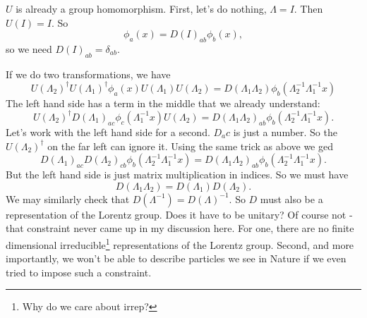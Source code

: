 \documentclass{book}
\begin{document}
$U$ is already a group homomorphism. First, let's do nothing, $\Lambda = I$. Then $U(I) = I$. So
\[
\phi_a (x) = D(I)_{ab} \phi_b (x),
\]
so we need $D(I)_{ab} = \delta_{ab}$.

If we do two transformations, we have
\[
U(\Lambda_2)^\dagger U(\Lambda_1)^\dagger \phi_a (x) U(\Lambda_1) U(\Lambda_2) = D(\Lambda_1 \Lambda_2) \phi_b (\Lambda_2^{-1} \Lambda_1^{-1}x)
\]
The left hand side has a term in the middle that we already understand:
\[
U(\Lambda_2)^\dagger D(\Lambda_1)_{ac} \phi_c(\Lambda_1^{-1} x) U(\Lambda_2) = D(\Lambda_1 \Lambda_2)_{ab} \phi_b (\Lambda_2^{-1} \Lambda_1^{-1} x).
\]
Let's work with the left hand side for a second. $D_ac$ is just a number. So the $U(\Lambda_2)^\dagger$ on the far left can ignore it. Using the same trick as above we ged
\[
D(\Lambda_1)_{ac} D(\Lambda_2)_{cb} \phi_b (\Lambda_2^{-1} \Lambda_1^{-1} x) = D(\Lambda_1 \Lambda_2)_{ab} \phi_b (\Lambda_2^{-1} \Lambda_1^{-1} x).
\]
But the left hand side is just matrix multiplication in indices. So we must have
\[
D (\Lambda_1 \Lambda_2) = D(\Lambda_1) D(\Lambda_2).
\]
We may similarly check that $D(\Lambda^{-1}) = D(\Lambda)^{-1}$. So $D$ must also be a representation of the Lorentz group. Does it have to be unitary? Of course not - that constraint never came up in my discussion here. For one, there are no finite dimensional irreducible\footnote{Why do we care about irrep?} representations of the Lorentz group. Second, and more importantly, we won't be able to describe particles we see in Nature if we even tried to impose such a constraint.
\end{document}
